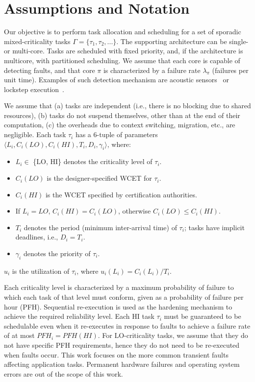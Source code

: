 \documentclass[conference]{IEEEtran}
\begin{document}
\section{Assumptions and Notation}
\label{sec:notation}
Our objective is to perform task allocation and scheduling for a set of sporadic mixed-criticality tasks $\Gamma = \{\tau_1,\tau_2,...\}$. The supporting architecture can be single- or multi-core. Tasks are scheduled with fixed priority, and, if the architecture is multicore, with partitioned scheduling. We assume that each core is capable of detecting faults, and that core $\pi$ is characterized by a failure rate $\lambda_{\pi}$ (failures per unit time). Examples of such detection mechanism are acoustic sensors~\cite{UpasaniISCA2014} or lockstep execution~\cite{baleani2003}. 


We assume that (a) tasks are independent (i.e., there is no blocking due to shared resources), (b) tasks do not suspend themselves, other than at the end of their computation, (c) the overheads due to context switching, migration, etc., are negligible. Each task $\tau_i$ has a 6-tuple of parameters $\langle L_i, C_i(LO), C_i(HI), T_i, D_i, \gamma_i \rangle$, where:
\begin{itemize}
  \item $L_i \in $  \{LO, HI\} denotes the criticality level of $\tau_i$.
  \item $C_i(LO)$ is the designer-specified WCET for $\tau_i$.
  \item $C_i(HI)$ is the WCET specified by certification authorities.
  \item If $L_i=LO$, $C_i(HI)=C_i(LO)$, otherwise $C_i(LO)\leq C_i(HI)$.
  \item $T_i$ denotes the period (minimum inter-arrival time) of $\tau_i$; tasks have implicit deadlines, i.e., $D_i=T_i$.
\item $\gamma_i$ denotes the priority of $\tau_i$.
\end{itemize}
$u_i$ is the utilization of $\tau_i$, where $u_i(L_i)=C_i(L_i)/T_i$.

Each criticality level is characterized by a maximum probability of failure to which each task of that level must conform, given as a probability of failure per hour (PFH). Sequential re-execution is used as the hardening mechanism to achieve the required reliability level. Each HI task $\tau_i$ must be guaranteed to be schedulable even when it re-executes in response to faults to achieve a failure rate of at most $PFH_i = PFH({HI})$. For LO-criticality tasks, we assume that they do not have specific PFH requirements, hence they do not need to be re-executed when faults occur. This work focuses on the more common transient faults affecting application tasks. Permanent hardware failures and operating system errors are out of the scope of this work.
\end{document}
